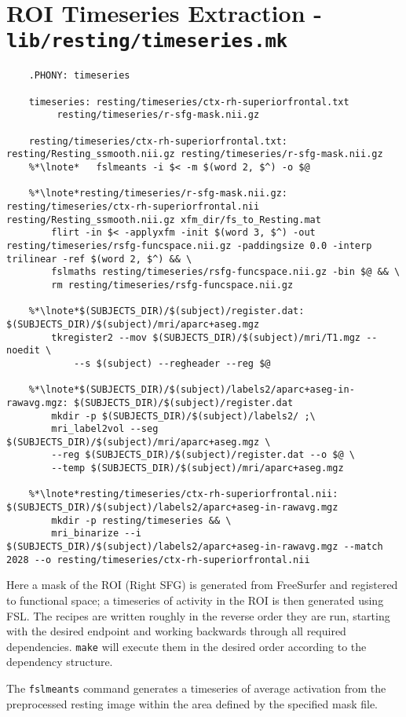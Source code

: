 \section{ROI Timeseries Extraction - \texttt{lib/resting/timeseries.mk}}
\begin{lstlisting}
	.PHONY: timeseries
	
	timeseries: resting/timeseries/ctx-rh-superiorfrontal.txt
		 resting/timeseries/r-sfg-mask.nii.gz
	
	resting/timeseries/ctx-rh-superiorfrontal.txt: resting/Resting_ssmooth.nii.gz resting/timeseries/r-sfg-mask.nii.gz
	%*\lnote*	fslmeants -i $< -m $(word 2, $^) -o $@
	
	%*\lnote*resting/timeseries/r-sfg-mask.nii.gz: resting/timeseries/ctx-rh-superiorfrontal.nii resting/Resting_ssmooth.nii.gz xfm_dir/fs_to_Resting.mat
		flirt -in $< -applyxfm -init $(word 3, $^) -out resting/timeseries/rsfg-funcspace.nii.gz -paddingsize 0.0 -interp trilinear -ref $(word 2, $^) && \
		fslmaths resting/timeseries/rsfg-funcspace.nii.gz -bin $@ && \
		rm resting/timeseries/rsfg-funcspace.nii.gz
	
	%*\lnote*$(SUBJECTS_DIR)/$(subject)/register.dat: $(SUBJECTS_DIR)/$(subject)/mri/aparc+aseg.mgz
		tkregister2 --mov $(SUBJECTS_DIR)/$(subject)/mri/T1.mgz --noedit \
			--s $(subject) --regheader --reg $@
	
	%*\lnote*$(SUBJECTS_DIR)/$(subject)/labels2/aparc+aseg-in-rawavg.mgz: $(SUBJECTS_DIR)/$(subject)/register.dat
		mkdir -p $(SUBJECTS_DIR)/$(subject)/labels2/ ;\
		mri_label2vol --seg $(SUBJECTS_DIR)/$(subject)/mri/aparc+aseg.mgz \
		--reg $(SUBJECTS_DIR)/$(subject)/register.dat --o $@ \
		--temp $(SUBJECTS_DIR)/$(subject)/mri/aparc+aseg.mgz
	
	%*\lnote*resting/timeseries/ctx-rh-superiorfrontal.nii: $(SUBJECTS_DIR)/$(subject)/labels2/aparc+aseg-in-rawavg.mgz
		mkdir -p resting/timeseries && \
		mri_binarize --i $(SUBJECTS_DIR)/$(subject)/labels2/aparc+aseg-in-rawavg.mgz --match 2028 --o resting/timeseries/ctx-rh-superiorfrontal.nii
\end{lstlisting}
Here a mask of the ROI (Right SFG) is generated from FreeSurfer and registered to functional space; a timeseries of activity in the ROI is then generated using FSL. The recipes are written roughly in the reverse order they are run, starting with the desired endpoint and working backwards through all required dependencies. \texttt{make} will execute them in the desired order according to the dependency structure.

The \texttt{fslmeants} command generates a timeseries of average activation from the preprocessed resting image within the area defined by the specified mask file.

